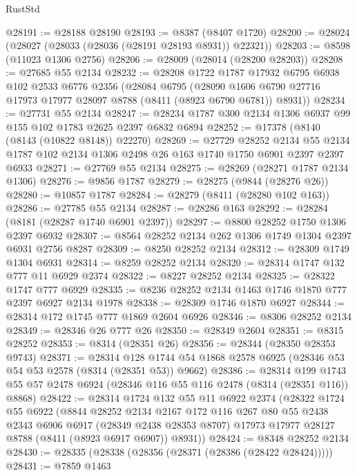 \begin{lexlean}{RustStd}
\begin{coremodule}
@28191 := @28188 @28190
@28193 := @8387 (@8407 @1720)
@28200 := @28024 (@28027 (@28033 (@28036 (@28191 @28193 @8931)) @22321))
@28203 := @8598 (@11023 @1306 @2756)
@28206 := @28009 (@28014 (@28200 @28203))
@28208 := @27685 @55 @2134
@28232 := @28208
    @1722
    @1787
    @17932
    @6795
    @6938
    @102
    @2533
    @6776
    @2356
    (@28084
      @6795
      (@28090 @1606 @6790 @27716 @17973 @17977 @28097 @8788 (@8411 (@8923 @6790 @6781)) @8931))
@28234 := @27731 @55 @2134
@28247 := @28234 @1787 @300 @2134 @1306 @6937 @99 @155 @102 @1783 @2625 @2397 @6832 @6894
@28252 := @17378 (@8140 (@8143 (@10822 @8148)) @22270)
@28269 := @27729
    @28252
    @2134
    @55
    @2134
    @1787
    @102
    @2134
    @1306
    @2498
    @26
    @163
    @1740
    @1750
    @6901
    @2397
    @2397
    @6933
@28271 := @27769 @55 @2134
@28275 := @28269 (@28271 @1787 @2134 @1306)
@28276 := @9856 @1787
@28279 := @28275 (@9844 (@28276 @26))
@28280 := @10857 @1787
@28284 := @28279 (@8411 (@28280 @102 @163))
@28286 := @27785 @55 @2134
@28287 := @28286 @163
@28292 := @28284 (@8181 (@28287 @1740 @6901 @2397))
@28297 := @8800 @28252 @1750 @1306 @2397 @6932
@28307 := @8564 @28252 @2134 @262 @1306 @1749 @1304 @2397 @6931 @2756 @8287
@28309 := @8250 @28252 @2134
@28312 := @28309 @1749 @1304 @6931
@28314 := @8259 @28252 @2134
@28320 := @28314 @1747 @132 @777 @11 @6929 @2374
@28322 := @8227 @28252 @2134
@28325 := @28322 @1747 @777 @6929
@28335 := @8236 @28252 @2134 @1463 @1746 @1870 @777 @2397 @6927 @2134 @1978
@28338 := @28309 @1746 @1870 @6927
@28344 := @28314 @172 @1745 @777 @1869 @2604 @6926
@28346 := @8306 @28252 @2134
@28349 := @28346 @26 @777 @26
@28350 := @28349 @2604
@28351 := @8315 @28252
@28353 := @8314 (@28351 @26)
@28356 := @28344 (@28350 @28353 @9743)
@28371 := @28314
    @128
    @1744
    @54
    @1868
    @2578
    @6925
    (@28346 @53 @54 @53 @2578 (@8314 (@28351 @53)) @9662)
@28386 := @28314
    @199
    @1743
    @55
    @57
    @2478
    @6924
    (@28346 @116 @55 @116 @2478 (@8314 (@28351 @116)) @8868)
@28422 := @28314
    @1724
    @132
    @55
    @11
    @6922
    @2374
    (@28322
      @1724
      @55
      @6922
      (@8844
        @28252
        @2134
        @2167
        @172
        @116
        @267
        @80
        @55
        @2438
        @2343
        @6906
        @6917
        (@28349 @2438 @28353 @8707)
        @17973
        @17977
        @28127
        @8788
        (@8411 (@8923 @6917 @6907))
        @8931))
@28424 := @8348 @28252 @2134
@28430 := @28335 (@28338 (@28356 (@28371 (@28386 (@28422 @28424)))))
@28431 := @7859 @1463

\end{coremodule}
\end{lexlean}
